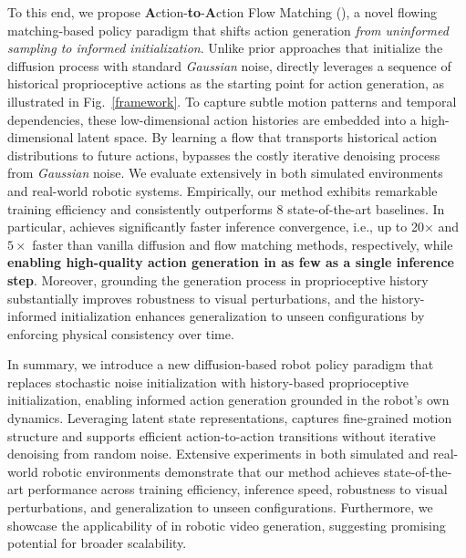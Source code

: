 
To this end, we propose \textbf{A}ction-\textbf{to}-\textbf{A}ction {Flow} Matching (\textbf{\m{}}), a novel flowing matching-based policy paradigm that shifts action generation \textit{from uninformed sampling to informed initialization}. Unlike prior approaches that initialize the diffusion process with standard \textit{Gaussian} noise, \m{} directly leverages a sequence of historical proprioceptive actions as the starting point for action generation, as illustrated in Fig.~\ref{framework}. To capture subtle motion patterns and temporal dependencies, these low-dimensional action histories are embedded into a high-dimensional latent space. By learning a flow that transports historical action distributions to future actions, \m{} bypasses the costly iterative denoising process from \textit{Gaussian} noise.
We evaluate \m{} extensively in both simulated environments and real-world robotic systems. Empirically, our method exhibits remarkable training efficiency and consistently outperforms 8 state-of-the-art baselines.
In particular, \m{} achieves significantly faster inference convergence, i.e., up to 20$\times$ and $5\times$ faster than vanilla diffusion and flow matching methods, respectively, while \textbf{enabling high-quality action generation in as few as a single inference step}. 
Moreover, grounding the generation process in proprioceptive history substantially improves robustness to visual perturbations, and the history-informed initialization enhances generalization to unseen configurations by enforcing physical consistency over time.

In summary, we introduce a new diffusion-based robot policy paradigm that replaces stochastic noise initialization with history-based proprioceptive initialization, enabling informed action generation grounded in the robot’s own dynamics. Leveraging latent state representations, \m{} captures fine-grained motion structure and supports efficient action-to-action transitions without iterative denoising from random noise. Extensive experiments in both simulated and real-world robotic environments demonstrate that our method achieves state-of-the-art performance across training efficiency, inference speed, robustness to visual perturbations, and generalization to unseen configurations. Furthermore, we showcase the applicability of \m{} in robotic video generation, suggesting promising potential for broader scalability.
